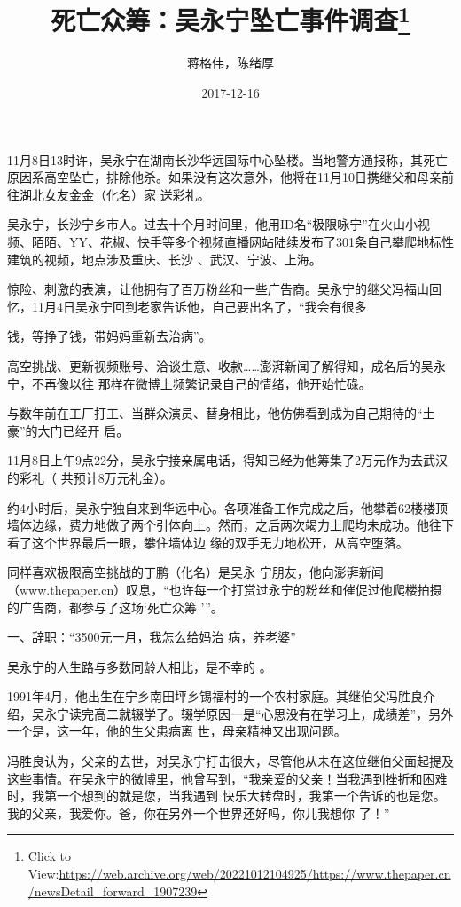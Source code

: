 \documentclass{article}
\title{死亡众筹：吴永宁坠亡事件调查\footnote{Click to View:\url{https://web.archive.org/web/20221012104925/https://www.thepaper.cn/newsDetail_forward_1907239}}}
\author{蒋格伟，陈绪厚}
\date{2017-12-16}
\begin{document}

\maketitle


\Large

﻿11月8日13时许，吴永宁在湖南长沙华远国际中心坠楼。当地警方通报称，其死亡原因系高空坠亡，排除他杀。如果没有这次意外，他将在11月10日携继父和母亲前往湖北女友金金（化名）家
送彩礼。 

吴永宁，长沙宁乡市人。过去十个月时间里，他用ID名“极限咏宁”在火山小视频、陌陌、YY、花椒、快手等多个视频直播网站陆续发布了301条自己攀爬地标性建筑的视频，地点涉及重庆、长沙
、武汉、宁波、上海。 

惊险、刺激的表演，让他拥有了百万粉丝和一些广告商。吴永宁的继父冯福山回忆，11月4日吴永宁回到老家告诉他，自己要出名了，“我会有很多
\newpage

钱，等挣了钱，带妈妈重新去治病”。 

高空挑战、更新视频账号、洽谈生意、收款……澎湃新闻了解得知，成名后的吴永宁，不再像以往
那样在微博上频繁记录自己的情绪，他开始忙碌。 

与数年前在工厂打工、当群众演员、替身相比，他仿佛看到成为自己期待的“土豪”的大门已经开
启。 

11月8日上午9点22分，吴永宁接亲属电话，得知已经为他筹集了2万元作为去武汉的彩礼（
共预计8万元礼金）。 

约4小时后，吴永宁独自来到华远中心。各项准备工作完成之后，他攀着62楼楼顶墙体边缘，费力地做了两个引体向上。然而，之后两次竭力上爬均未成功。他往下看了这个世界最后一眼，攀住墙体边
缘的双手无力地松开，从高空堕落。 

同样喜欢极限高空挑战的丁鹏（化名）是吴永
\newpage
宁朋友，他向澎湃新闻（www.thepaper.cn）叹息，“也许每一个打赏过永宁的粉丝和催促过他爬楼拍摄的广告商，都参与了这场‘死亡众筹
’”。 

一、辞职：“3500元一月，我怎么给妈治
病，养老婆” 

吴永宁的人生路与多数同龄人相比，是不幸的
。 

1991年4月，他出生在宁乡南田坪乡锡福村的一个农村家庭。其继伯父冯胜良介绍，吴永宁读完高二就辍学了。辍学原因一是“心思没有在学习上，成绩差”，另外一个是，这一年，他的生父患病离
世，母亲精神又出现问题。 

冯胜良认为，父亲的去世，对吴永宁打击很大，尽管他从未在这位继伯父面起提及这些事情。在吴永宁的微博里，他曾写到，“我亲爱的父亲！当我遇到挫折和困难时，我第一个想到的就是您，当我遇到
\newpage
快乐大转盘时，我第一个告诉的也是您。我的父亲，我爱你。爸，你在另外一个世界还好吗，你儿我想你
了！” 
\end{document}
